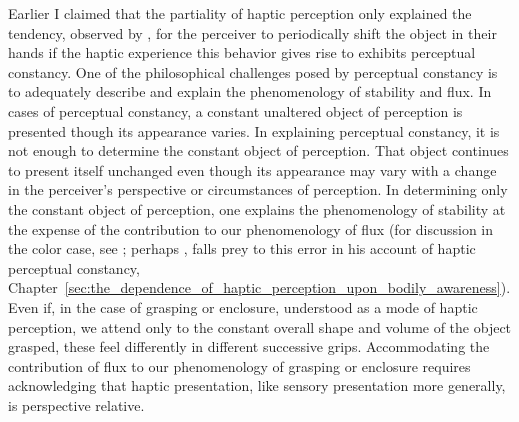 Earlier I claimed that the partiality of haptic perception only explained the tendency, observed by \citet{Lederman:1987fr}, for the perceiver to periodically shift the object in their hands if the haptic experience this behavior gives rise to exhibits perceptual constancy. One of the philosophical challenges posed by perceptual constancy is to adequately describe and explain the phenomenology of stability and flux. In cases of perceptual constancy, a constant unaltered object of perception is presented though its appearance varies. In explaining perceptual constancy, it is not enough to determine the constant object of perception. That object continues to present itself unchanged even though its appearance may vary with a change in the perceiver's perspective or circumstances of perception. In determining only the constant object of perception, one explains the phenomenology of stability at the expense of the contribution to our phenomenology of flux (for discussion in the color case, see \citealt{Cohen:2008hc,Hilbert:2007qy}; perhaps \citealt[98]{Fulkerson:2014ek}, falls prey to this error in his account of haptic perceptual constancy, Chapter~\ref{sec:the_dependence_of_haptic_perception_upon_bodily_awareness}). Even if, in the case of grasping or enclosure, understood as a mode of haptic perception, we attend only to the constant overall shape and volume of the object grasped, these feel differently in different successive grips. Accommodating the contribution of flux to our phenomenology of grasping or enclosure requires acknowledging that haptic presentation, like sensory presentation more generally, is perspective relative.

